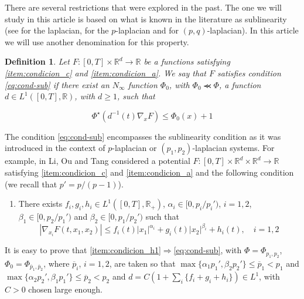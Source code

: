 \documentclass[twoside]{article}
\makeatletter
\newtheorem{defi}[thm]{Definition}
\theoremstyle{remark}
\newcounter{example}[section]
\newcommand{\labitem}[2]{%
\def\@itemlabel{#1}
\item
\def\@currentlabel{#1}\label{#2}}
\newcommand{\rr}{\mathbb{R}}
\renewcommand{\leq}{\leqslant}
\renewcommand{\geq}{\geqslant}
\makeatother
\begin{document}
There are several restrictions that were explored in the past. The one we will study in this article is based on what is known in the literature as sublinearity (see \cite{tang1998periodic,wu1999periodic,zhao2004periodic} for the laplacian, \cite{tang2010periodic,li2015infinitely} for the $p$-laplacian and \cite{yang2013existence,li2014periodic,pasca2010periodic,pacsca2010some} for $(p,q)$-laplacian). In this article we will use another denomination for this property.




\begin{defi} Let $F:[0,T]\times \rr^d\to\rr$ be a functions satisfying \ref{item:condicion_c} and \ref{item:condicion_a}. We say that $F$ satisfies condition \eqref{eq:cond-sub} if there exist an $N_{\infty}$ function $\Phi_0$, with $\Phi_0 \llcurly \Phi$,
a function $d \in  L^1([0,T],\rr)$, with $d\geq 1$, such that

\begin{equation}\label{eq:cond-sub}
  \Phi^{\star}(d^{-1}(t)\nabla_x F)\leq \Phi_0(x)+1\tag{$B$}
\end{equation}
\end{defi}


The condition \eqref{eq:cond-sub} encompasses the sublinearity condition as it was introduced in the context of $p$-laplacian or $(p_1,p_2)$-laplacian systems. For example, in
 \cite[Th. 1.1.]{li2014periodic} Li, Ou and Tang considered a potential $F:[0,T]\times\rr^d\times\rr^d\to\rr$ satisfying \ref{item:condicion_c} and \ref {item:condicion_a} and the following condition  (we recall that $p'=p/(p-1)$). 
\begin{enumerate}   
  \labitem{(H)}{item:condicion_h1} There exists $f_i,g_i,h_i\in L^1([0,T],\rr_+)$,  $\alpha_i\in [0,p_i/p_i')$, $i=1,2$,  $\beta_1\in [0,p_2/p_1')$ and $\beta_2\in [0,p_1/p_2')$ such that
 \begin{equation*}
    |\nabla_{x_i}F(t,x_1,x_2)|\leq f_i(t)|x_1|^{\alpha_i}+g_i(t)|x_2|^{\beta_i}+h_i(t),\quad i=1,2
 \end{equation*}
\end{enumerate}
It is easy to prove that \ref{item:condicion_h1}$\Rightarrow$\eqref{eq:cond-sub}, with $\Phi=\Phi_{p_1,p_2}$, 
$\Phi_0=\Phi_{\overline{p}_1,\overline{p}_2}$, where $\overline{p}_i$, $i=1,2$, are taken so that  $\max\{\alpha_1p_1',\beta_2p_2'\}\leq \overline{p}_1<p_1$ and $\max\{\alpha_2p_2',\beta_1p_1'\}\leq \overline{p}_2<p_2$ and  $d=C(1+\sum_i \{f_i+g_i+h_i\})\in L^1$, with  $C>0$ chosen large enough.
\end{document}
